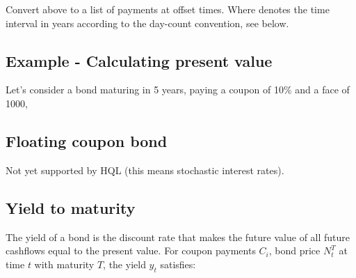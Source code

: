 \documentclass[11pt,a4paper]{article}
\numberwithin{equation}{section}
\begin{document}
	Convert above to a list of payments at offset times. Where denotes the time interval in years
	according to the day-count convention, see below.

	\subsection{Example - Calculating present value}


	Let's consider a bond maturing in 5 years, paying a coupon of 10\% and a face of 1000,


	\subsection{Floating coupon bond}
	Not yet supported by HQL (this means stochastic interest rates).

	\subsection{Yield to maturity}

	The yield of a bond is the discount rate that makes the future value of all future
	cashflows equal to the present value. For coupon payments $C_i$, bond price $N_t^T$
	at time $t$ with maturity $T$, the yield $y_t$ satisfies: 
\end{document}
